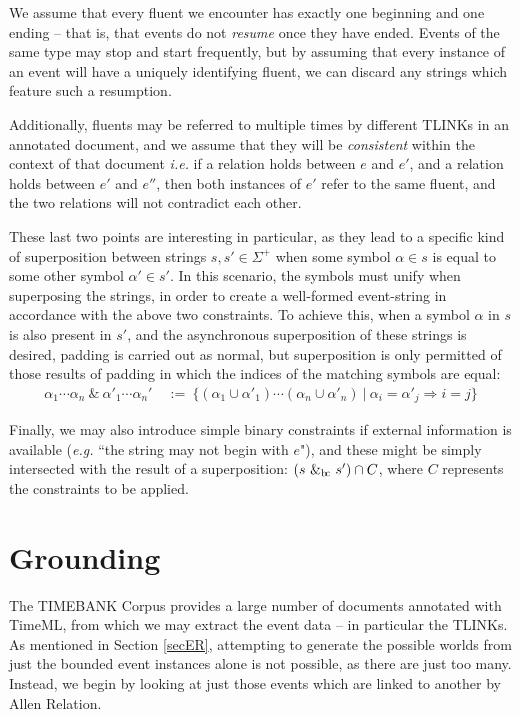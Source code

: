 \documentclass[a4paper,11pt]{article}
\newcommand{\bc}{{\rm b\!c}}
\begin{document}
We assume that every fluent we encounter has exactly one beginning and one 
ending -- that is, that events do not \textit{resume} once they have ended. 
Events of the same type may stop and start frequently, but by assuming that 
every instance of an event will have a uniquely identifying fluent, we can 
discard any strings which feature such a resumption.

Additionally, fluents 
may be referred to multiple times by different TLINKs in an annotated document, 
and we assume that they will be \textit{consistent} within the context of that 
document \textit{i.e.} if a relation holds between $e$ and $e'$, and a relation 
holds between $e'$ and $e''$, then both instances of $e'$ refer to the same 
fluent, and the two relations will not contradict each other.

These last two points are interesting in particular, as they lead to a specific 
kind of superposition between strings $s, s' \in \Sigma^+$ when some 
symbol $\alpha \in s$ is equal to some other symbol $\alpha' \in s'$. In this 
scenario, the symbols must unify when superposing the strings, in order to 
create a well-formed event-string in accordance with the above two constraints. 
To achieve this, when a symbol $\alpha$ in $s$ is also present in $s'$, and the 
asynchronous superposition of these strings is desired, padding is carried out 
as normal, but superposition is only permitted of those results of padding 
in which the indices of the matching symbols are equal:
\begin{align*}
\alpha_1\cdots\alpha_n \ \&\ 
\alpha'_1\cdots\alpha_n' & \ :=\
\{(\alpha_1\cup\alpha'_1)\cdots(\alpha_n\cup\alpha'_n) ~|~ \alpha_i = \alpha'_j 
\Rightarrow i = j\}
\end{align*}

Finally, we may also introduce simple binary constraints if external 
information is 
available (\textit{e.g.} ``the string may not begin with $e$"), and these might 
be 
simply intersected with the result of a superposition: $(s\ \&_{\bc} \ s') \cap 
C$, where $C$ represents the constraints to be applied.

\section{Grounding}
The TIMEBANK Corpus \citep{pustejovsky2003timebank} provides a large number of 
documents annotated with TimeML, from which we may extract the event data -- in 
particular the TLINKs. As mentioned in Section \ref{secER}, attempting to 
generate the possible worlds from just the bounded event instances alone is not 
possible, as there are just too many. Instead, we begin by looking at just 
those events which are linked to another by Allen Relation.
\end{document}
